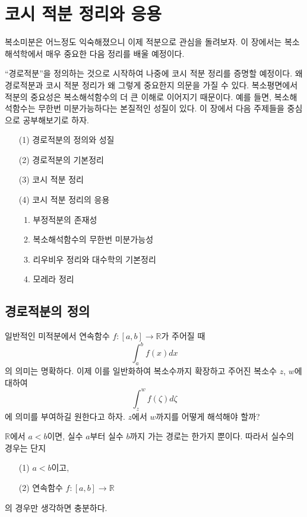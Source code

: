 
\chapter{코시 적분 정리와 응용}

복소미분은 어느정도 익숙해졌으니 이제 적분으로 관심을 돌려보자.
이 장에서는 복소해석학에서 매우 중요한 다음 정리를 배울 예정이다.
\begin{center}
\end{center}
``경로적분''을 정의하는 것으로 시작하여 나중에 코시 적분 정리를 증명할 예정이다.
왜 경로적분과 코시 적분 정리가 왜 그렇게 중요한지 의문을 가질 수 있다.
복소평면에서 적분의 중요성은 복소해석함수의 더 큰 이해로 이어지기 때문이다.
예를 들면, 복소해석함수는 무한번 미분가능하다는 본질적인 성질이 있다.
이 장에서 다음 주제들을 중심으로 공부해보기로 하자.
\begin{enumerate}
\item[(1)] 경로적분의 정의와 성질
\item[(2)] 경로적분의 기본정리
\item[(3)] 코시 적분 정리
\item[(4)] 코시 적분 정리의 응용
\begin{enumerate}
\item 부정적분의 존재성
\item 복소해석함수의 무한번 미분가능성
\item 리우비우 정리와 대수학의 기본정리
\item 모레라 정리
\end{enumerate}
\end{enumerate}

\section{경로적분의 정의}

일반적인 미적분에서 연속함수 $f: [a,b] \to \mathbb R$가 주어질 때
\begin{equation}\label{eq-3-1}
\int_a^b f(x)dx
\end{equation}
의 의미는 명확하다. 이제 이를  일반화하여 복소수까지 확장하고
주어진 복소수 $z$, $w$에 대하여
\[
\int_z^w f(\zeta)d\zeta
\]
에 의미를 부여하길 원한다고 하자.
$z$에서 $w$까지를 어떻게 해석해야 할까?

$\mathbb R$에서 $a<b$이면, 실수 $a$부터  실수 $b$까지
가는 경로는 한가지 뿐이다.  
따라서 실수의 경우는 단지
\begin{itemize}
\item[(1)] $a<b$이고,
\item[(2)] 연속함수 $f:[a,b] \to \mathbb R$
\end{itemize}
의 경우만 생각하면 충분하다.

